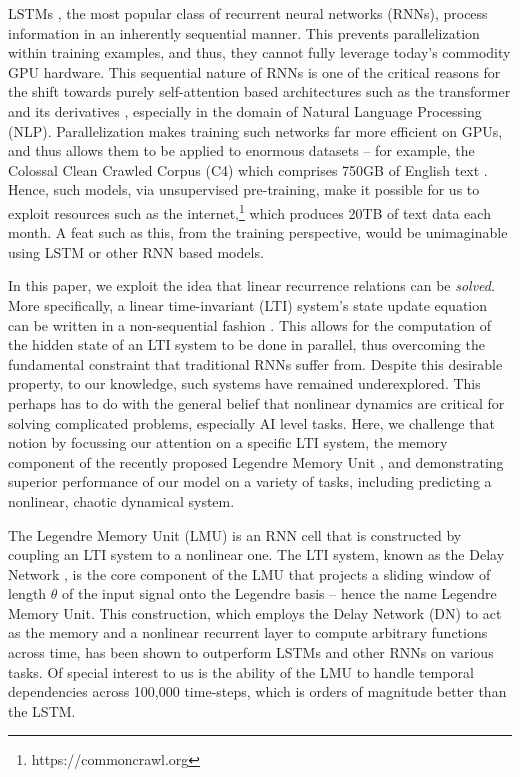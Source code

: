 \documentclass{article}
\begin{document}
LSTMs \cite{hochreiter1997long}, the most popular class of recurrent neural networks (RNNs), process information in an inherently sequential manner. This prevents parallelization within training examples, and thus, they cannot fully leverage today's commodity GPU hardware. This sequential nature of RNNs is one of the critical reasons for the shift towards purely self-attention based architectures such as the transformer and its derivatives \cite{vaswani2017attention, devlin2018bert, brown2020language}, especially in the domain of Natural Language Processing (NLP). Parallelization makes training such networks far more efficient on GPUs, and thus allows them to be applied to enormous datasets -- for example, the Colossal Clean Crawled Corpus (C4) which comprises 750GB of English text \citep{raffel2019exploring}. Hence, such models, via unsupervised pre-training, make it possible for us to exploit resources such as the internet,\footnote{https://commoncrawl.org} which produces 20TB of text data each month. A feat such as this, from the training perspective, would be unimaginable using LSTM or other RNN based models.

In this paper, we exploit the idea that linear recurrence relations can be {\it solved}. More specifically, a linear time-invariant (LTI) system's state update equation can be written in a non-sequential fashion \cite{aastrom2010feedback}. This allows for the computation of the hidden state of an LTI system to be done in parallel, thus overcoming the fundamental constraint that traditional RNNs suffer from. Despite this desirable property, to our knowledge, such systems have remained underexplored. This perhaps has to do with the general belief that nonlinear dynamics are critical for solving complicated problems, especially AI level tasks. Here, we challenge that notion by focussing our attention on a specific LTI system, the memory component of the recently proposed Legendre Memory Unit \citep{voelker2019legendre}, and demonstrating superior performance of our model on a variety of tasks, including predicting a nonlinear, chaotic dynamical system.

The Legendre Memory Unit (LMU) is an RNN cell that is constructed by coupling an LTI system to a nonlinear one. The LTI system, known as the Delay Network \citep{voelker2018improving}, is the core component of the LMU that projects a sliding window of length $\theta$ of the input signal onto the Legendre basis -- hence the name Legendre Memory Unit. This construction, which employs the Delay Network (DN) to act as the memory and a nonlinear recurrent layer to compute arbitrary functions across time, has been shown to outperform LSTMs and other RNNs on various tasks. Of special interest to us is the ability of the LMU to handle temporal dependencies across 100,000 time-steps, which is orders of magnitude better than the LSTM.
\end{document}
